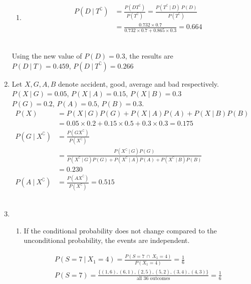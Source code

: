 \begin{enumerate}
\begin{enumerate}
		\item \begin{align}
			P(D\ |\ T^\complement) &= \frac{P(DT^\complement)}{P(T^\complement)} = \frac{P(T^\complement\ |\ D) \ P(D)}{P(T^\complement)} \\
			&= \frac{0.732 \times 0.7}{0.732 \times 0.7 + 0.865 \times 0.3} = 0.664
		\end{align} \\
	\end{enumerate}
	
	Using the new value of $ P(D) = 0.3 $, the results are \\
	$ P(D\ |\ T) =  0.459$, $ P(D\ |\ T^\complement) = 0.266$\\
	
	\item Let $ X, G, A, B $ denote accident, good, average and bad respectively. \\
	$ P(X\ |\ G) = 0.05 $, $ P(X\ |\ A) = 0.15 $, $ P(X\ |\ B) = 0.3 $ \\
	$ P(G) = 0.2 $, $ P(A) = 0.5 $, $ P(B) = 0.3 $.\\
	
		\begin{align}
			P(X) &= P(X\ |\ G) P(G) + P(X\ |\ A) P(A) + P(X\ |\ B) P(B) \\
			&= 0.05 \times 0.2 + 0.15 \times 0.5 + 0.3 \times 0.3 = 0.175 \\
			P(G\ |\ X^\complement) &= \frac{P(G X^\complement)}{P(X^\complement)} \\
			&= \frac{P(X^\complement \ |\ G)P(G)}{P(X^\complement \ |\ G)P(G) + P(X^\complement \ |\ A)P(A) +P(X^\complement \ |\ B)P(B)} \\
			&= 0.230 \\
			P(A\ |\ X^\complement) &= \frac{P(A X^\complement)}{P(X^\complement)} = 0.515
		\end{align} \\
	
	
	\item \begin{enumerate}
		\item If the conditional probability does not change compared to the unconditional probability, the events are independent.
		
		
			\begin{align}
				P(S = 7 \ |\ X_1 = 4) = \frac{P(S = 7 \ \cap\ X_1 = 4)}{P(X_1 = 4)} = \frac{1}{6} \\
				P(S = 7) = \frac{\{ (1,6), (6,1), (2,5), (5,2), (3,4), (4,3) \}}{\text{all 36 outcomes}} = \frac{1}{6}
			\end{align} \\
			

\end{enumerate}
\end{enumerate}
